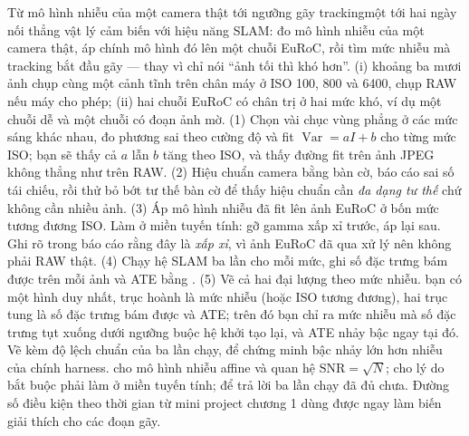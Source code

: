 \documentclass[../../deep_learning.tex]{subfiles}
\begin{document}
\begin{duan}{Từ mô hình nhiễu của một camera thật tới ngưỡng gãy tracking}{một tới hai ngày}
\dmt nối thẳng vật lý cảm biến với hiệu năng SLAM: đo mô hình nhiễu của một camera thật, áp chính mô hình đó lên một chuỗi EuRoC, rồi tìm mức nhiễu mà tracking bắt đầu gãy --- thay vì chỉ nói ``ảnh tối thì khó hơn''.
\ddl (i) khoảng ba mươi ảnh chụp cùng một cảnh tĩnh trên chân máy ở ISO 100, 800 và 6400, chụp RAW nếu máy cho phép; (ii) hai chuỗi EuRoC có chân trị ở hai mức khó, ví dụ một chuỗi dễ và một chuỗi có đoạn ảnh mờ.
\dbc (1) Chọn vài chục vùng phẳng ở các mức sáng khác nhau, đo phương sai theo cường độ và fit \(\operatorname{Var}=aI+b\) cho từng mức ISO; bạn sẽ thấy cả \(a\) lẫn \(b\) tăng theo ISO, và thấy đường fit trên ảnh JPEG không thẳng như trên RAW. (2) Hiệu chuẩn camera bằng bàn cờ, báo cáo sai số tái chiếu, rồi thử bỏ bớt tư thế bàn cờ để thấy hiệu chuẩn cần \emph{đa dạng tư thế} chứ không cần nhiều ảnh. (3) Áp mô hình nhiễu đã fit lên ảnh EuRoC ở bốn mức tương đương ISO. Làm ở miền tuyến tính: gỡ gamma xấp xỉ trước, áp lại sau. Ghi rõ trong báo cáo rằng đây là \emph{xấp xỉ}, vì ảnh EuRoC đã qua xử lý nên không phải RAW thật. (4) Chạy hệ SLAM ba lần cho mỗi mức, ghi số đặc trưng bám được trên mỗi ảnh và ATE bằng . (5) Vẽ cả hai đại lượng theo mức nhiễu.
\dxk bạn có một hình duy nhất, trục hoành là mức nhiễu (hoặc ISO tương đương), hai trục tung là số đặc trưng bám được và ATE; trên đó bạn chỉ ra mức nhiễu mà số đặc trưng tụt xuống dưới ngưỡng buộc hệ khởi tạo lại, và ATE nhảy bậc ngay tại đó. Vẽ kèm độ lệch chuẩn của ba lần chạy, để chứng minh bậc nhảy lớn hơn nhiễu của chính harness.
\dnv {} cho mô hình nhiễu affine và quan hệ \(\mathrm{SNR}=\sqrt{N}\);  cho lý do bắt buộc phải làm ở miền tuyến tính;  để trả lời ba lần chạy đã đủ chưa. Đường số điều kiện theo thời gian từ mini project chương 1 dùng được ngay làm biến giải thích cho các đoạn gãy.
\end{duan}

\begin{traloi}
\end{traloi}
\end{document}
